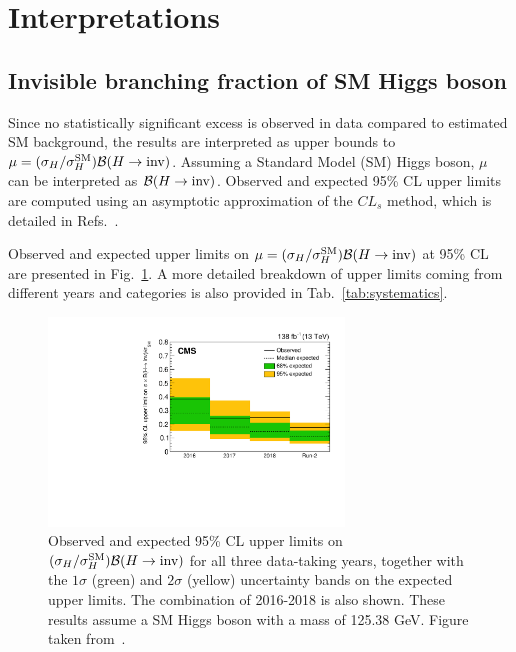 \section{Interpretations}
\label{sec:interpretations}

\graphicspath{{4_Results/Figures}}

\subsection{Invisible branching fraction of SM Higgs boson}

Since no statistically significant excess is observed in data compared to estimated SM background,
the results are interpreted as upper bounds to $\mu=(\sigma_{H}/\sigma_{H}^{\mathrm{SM}}) {\mathcal{B}(H\rightarrow\text{inv})}$. Assuming a Standard Model (SM) Higgs boson,
$\mu$ can be interpreted as ${\mathcal{B}(H\rightarrow\text{inv})}$.
Observed and expected 95\% CL upper limits are computed using an asymptotic approximation of the $CL_{s}$
method, which is detailed in Refs.~\cite{Junk:1999kv,Read:2002av}.

Observed and expected upper limits on $\mu={(\sigma_{H}/\sigma_{H}^{\mathrm{SM}}) {\mathcal{B}(H\rightarrow\text{inv})}}$ at 95\% CL are
presented in Fig.~\ref{fig:limit_short}. A more detailed breakdown of upper limits coming from different years
and categories is also provided in Tab.~\ref{tab:systematics}. 

\begin{figure}[htbp]
    \centering
    \includegraphics[width=0.7\textwidth]{from_paper/limits/limit_short.pdf}
    \caption{Observed and expected 95\% CL upper limits on $(\sigma_{H}/\sigma_{H}^{\mathrm{SM}}) {\mathcal{B}(H\rightarrow\text{inv})}$ for all three data-taking years,
    together with the $1\sigma$ (green) and $2\sigma$ (yellow) uncertainty bands on the expected upper limits.
    The combination of 2016-2018 is also shown. These results assume a SM Higgs boson with a mass of 125.38 GeV.
    Figure taken from~\cite{VBFHinvAnalysisPaper}.}
    \label{fig:limit_short}
\end{figure}

